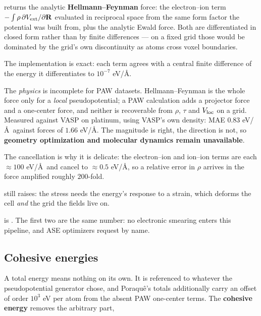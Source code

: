  returns the analytic \textbf{Hellmann--Feynman} force: the
electron--ion term $-\int\rho\,\partial V_{\mathrm{ext}}/\partial\mathbf{R}$ evaluated in
reciprocal space from the same  form factor the potential was
built from, plus the analytic Ewald force. Both are differentiated in closed
form rather than by finite differences --- on a fixed grid those would be
dominated by the grid's own discontinuity as atoms cross voxel boundaries.

The implementation is exact: each term agrees with a central finite difference
of the energy it differentiates to $10^{-7}$ eV/\AA.

\begin{pwarn}
The \emph{physics} is incomplete for PAW datasets. Hellmann--Feynman is the
whole force only for a \emph{local} pseudopotential; a PAW calculation adds a
projector force and a one-center force, and neither is recoverable from $\rho$,
$\tau$ and $V_{\rm loc}$ on a grid. Measured against VASP on platinum, using
VASP's own density: MAE $0.83$ eV/\AA\ against forces of $1.66$ eV/\AA. The
magnitude is right, the direction is not, so \textbf{geometry optimization and
molecular dynamics remain unavailable}.

The cancellation is why it is delicate: the electron--ion and ion--ion terms
are each $\approx 100$ eV/\AA\ and cancel to $\approx 0.5$ eV/\AA, so a
relative error in $\rho$ arrives in the force amplified roughly $200$-fold.
\end{pwarn}

 still raises: the stress needs the energy's response to a
strain, which deforms the cell \emph{and} the grid the fields live on.

 is
. The first two are the same number:
no electronic smearing enters this pipeline, and ASE optimizers request
 by name.

\subsection{Cohesive energies}
\label{sec:cohesive}

A total energy means nothing on its own. It is referenced to whatever the
pseudopotential generator chose, and Poraqu\^e's totals additionally carry an
offset of order $10^{3}$ eV per atom from the absent PAW one-center terms. The
\textbf{cohesive energy} removes the arbitrary part,

